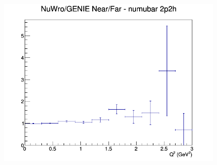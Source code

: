 \begin{figure}[h]
\endminipage
{}
\includegraphics[width=\linewidth]{Q2/nominal/ratios/2p2h_NuWro_GENIE_numubar_NF_Q2.png}
\endminipage
\newline
\end{figure}
\clearpage

